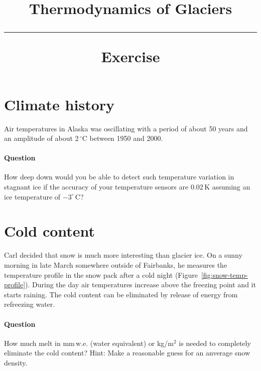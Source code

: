 \documentclass[parskip=half]{scrartcl}
\newcommand{\cels}[1]{\ensuremath{#1^{\circ}\,\mathrm{C}}}
\begin{document}
\vspace{-5em}

\title{Thermodynamics of Glaciers \\[.2em]
\rule[1em]{\textwidth}{2pt}
\LARGE\textsf{Exercise}
}
\date{}

\vspace{-5em}

\maketitle


\vspace{-5em}


\section{Climate history}

Air temperatures in Alaska was oscillating with a period of about 50 years and an amplitude of about 2$\,^\circ\text{C}$ between 1950 and 2000. 

\paragraph{Question} How deep down would you be able to detect such temperature variation in stagnant ice if the accuracy of your temperature sensors are 0.02$\,\text{K}$ assuming an ice temperature of $-\cels{3}$?

\section{Cold content}

Carl decided that snow is much more interesting than glacier ice. On a sunny morning in late March somewhere outside of Fairbanks, he measures the temperature profile in the snow pack after a cold night (Figure~\ref{fig:snow-temp-profile}). During the day air temperatures increase above the freezing point and it starts raining. The cold content can be eliminated by release of energy from refreezing water. 

\paragraph{Question} How much melt in mm\,w.e. (water equivalent) or kg/m$^{2}$ is needed to completely eliminate the cold content? Hint: Make a reasonable guess for an anverage snow density.
\end{document}
